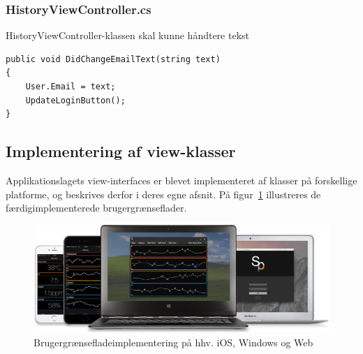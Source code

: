 \subsubsection{HistoryViewController.cs}
HistoryViewController-klassen skal kunne håndtere tekst

\begin{lstlisting}[caption={DidChangeEmailText(...)},label={code:application_impl_lvcdcet}]
public void DidChangeEmailText(string text)
{
	User.Email = text;
	UpdateLoginButton();
}
\end{lstlisting}

\subsection{Implementering af view-klasser}
Applikationslagets view-interfaces er blevet implementeret af klasser på forskellige platforme, og beskrives derfor i deres egne afsnit. På figur~\ref{fig:view_family} illustreres de færdigimplementerede brugergrænseflader. 

\begin{figure}
	\centering
	\includegraphics[width=1.0\linewidth]{figs/implementering/view_family}
	\caption{Brugergrænsefladeimplementering på hhv. iOS, Windows og Web}
	\label{fig:view_family}
\end{figure}